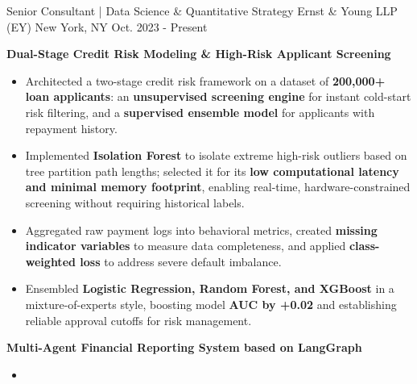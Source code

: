 \vspace{-2.0mm}
\begin{cventries}

\cventry
  {Senior Consultant | Data Science \& Quantitative Strategy}
  {Ernst \& Young LLP (EY)}
  {New York, NY}
  {Oct. 2023 - Present}
  {
    \begin{cvitems}
      \item {\textbf{Dual-Stage Credit Risk Modeling \& High-Risk Applicant Screening}}
        \begin{itemize}
          \item {
            Architected a two-stage credit risk framework on a dataset of \textbf{200,000+ loan applicants}: 
            an \textbf{unsupervised screening engine} for instant cold-start risk filtering, 
            and a \textbf{supervised ensemble model} for applicants with repayment history.
          }
          \item {
            Implemented \textbf{Isolation Forest} to isolate extreme high-risk outliers 
            based on tree partition path lengths; 
            selected it for its \textbf{low computational latency and minimal memory footprint}, 
            enabling real-time, hardware-constrained screening without requiring historical labels.
          }
          \item {
            Aggregated raw payment logs into behavioral metrics, 
            created \textbf{missing indicator variables} to measure data completeness, 
            and applied \textbf{class-weighted loss} to address severe default imbalance.
          }
          \item {
            Ensembled \textbf{Logistic Regression, Random Forest, and XGBoost} in a mixture-of-experts style, 
            boosting model \textbf{AUC by +0.02} and 
            establishing reliable approval cutoffs for risk management.
          }
        \end{itemize}
      \vspace{0.5mm}
      \item {\textbf{Multi-Agent Financial Reporting System based on LangGraph}}
        \begin{itemize}
          \item {
}
\end{itemize}
\end{cvitems}}
\end{cventries}

